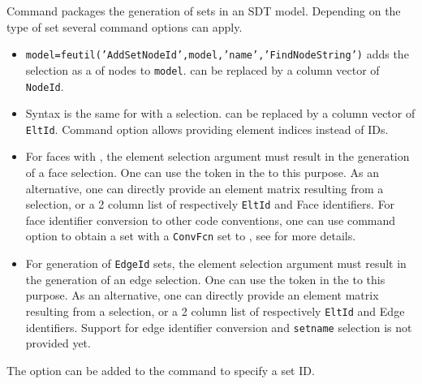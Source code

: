 
Command  packages the generation of sets in an SDT model. Depending on the type of set several command options can apply.

\begin{itemize}
\item {\tt model=feutil('AddSetNodeId',model,'name','FindNodeString')} adds the selection \texline \hyperlink{findnode}{} as a  of nodes  to {\tt model}. \hyperlink{findnode}{} can be replaced by a column vector of {\tt NodeId}.

\item Syntax is the same for  with a \hyperlink{findelt}{} selection. \hyperlink{findelt}{} can be replaced by a column vector of {\tt EltId}. Command option  allows providing element indices instead of IDs.

\item For faces with , the element selection argument \hyperlink{findelt}{} must result in the generation of a face selection. One can use the  token in the \hyperlink{findelt}{} to this purpose. As an alternative, one can directly provide an element matrix resulting from a  selection, or a 2 column list of respectively {\tt EltId} and Face identifiers.
For face identifier conversion to other code conventions, one can use command option  to obtain a set with a {\tt ConvFcn} set to , see  for more details.

\item For generation of {\tt EdgeId} sets, the element selection argument \hyperlink{findelt}{} must result in the generation of an edge selection. One can use the  token in the \hyperlink{findelt}{} to this purpose. As an alternative, one can directly provide an element matrix resulting from a  selection, or a 2 column list of respectively {\tt EltId} and Edge identifiers. Support for edge identifier conversion and {\tt setname} selection is not provided yet.
\end{itemize}

The option  can be added to the command to specify a set ID.

